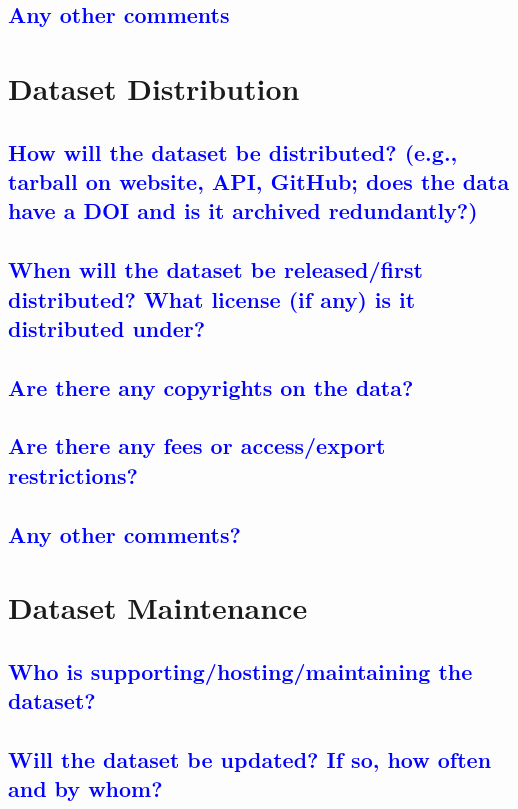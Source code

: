 \documentclass[letterpaper, 10 pt, conference]{ieeeconf}  %
\begin{document}
\textcolor{blue}{\subsection{Any other comments}}
\lipsum[1]

\section{Dataset Distribution}

\textcolor{blue}{\subsection{How will the dataset be distributed? (e.g., tarball on
website, API, GitHub; does the data have a DOI and is it
archived redundantly?)}}
\lipsum[1][1-10]


\textcolor{blue}{\subsection{When will the dataset be released/first distributed?
What license (if any) is it distributed under?}}
\lipsum[1]

\textcolor{blue}{\subsection{Are there any copyrights on the data?}}
\lipsum[1]


\textcolor{blue}{\subsection{Are there any fees or access/export restrictions?}}
\lipsum[1]

\textcolor{blue}{\subsection{Any other comments?}}
\lipsum[1]

\section{Dataset Maintenance}

\textcolor{blue}{\subsection{Who is supporting/hosting/maintaining the
dataset?}}
\lipsum[1]

\textcolor{blue}{\subsection{Will the dataset be updated? If so, how often and
by whom?}}
\lipsum[1]
\end{document}
